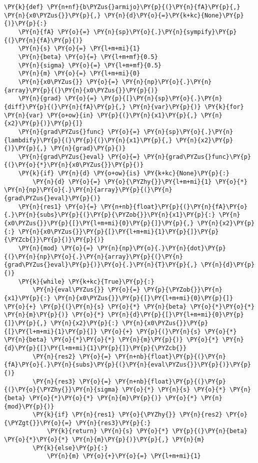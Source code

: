 \begin{itemize}
\begin{tcolorbox}[breakable, size=fbox, boxrule=1pt, pad at break*=1mm,colback=cellbackground, colframe=cellborder]
\begin{Verbatim}[commandchars=\\\{\}]
\PY{k}{def} \PY{n+nf}{b\PYZus{}armijo}\PY{p}{(}\PY{n}{fA}\PY{p}{,} \PY{n}{x0\PYZus{}}\PY{p}{,} \PY{n}{d}\PY{o}{=}\PY{k+kc}{None}\PY{p}{)}\PY{p}{:}
    \PY{n}{fA} \PY{o}{=} \PY{n}{sp}\PY{o}{.}\PY{n}{sympify}\PY{p}{(}\PY{n}{fA}\PY{p}{)}
    \PY{n}{s} \PY{o}{=} \PY{l+m+mi}{1}
    \PY{n}{beta} \PY{o}{=} \PY{l+m+mf}{0.5}
    \PY{n}{sigma} \PY{o}{=} \PY{l+m+mf}{0.5}
    \PY{n}{m} \PY{o}{=} \PY{l+m+mi}{0}
    \PY{n}{x0\PYZus{}} \PY{o}{=} \PY{n}{np}\PY{o}{.}\PY{n}{array}\PY{p}{(}\PY{n}{x0\PYZus{}}\PY{p}{)}
    \PY{n}{grad} \PY{o}{=} \PY{p}{[}\PY{n}{sp}\PY{o}{.}\PY{n}{diff}\PY{p}{(}\PY{n}{fA}\PY{p}{,} \PY{n}{var}\PY{p}{)} \PY{k}{for} \PY{n}{var} \PY{o+ow}{in} \PY{p}{(}\PY{n}{x1}\PY{p}{,} \PY{n}{x2}\PY{p}{)}\PY{p}{]}
    \PY{n}{grad\PYZus{}func} \PY{o}{=} \PY{n}{sp}\PY{o}{.}\PY{n}{lambdify}\PY{p}{(}\PY{p}{(}\PY{n}{x1}\PY{p}{,} \PY{n}{x2}\PY{p}{)}\PY{p}{,} \PY{n}{grad}\PY{p}{)}
    \PY{n}{grad\PYZus{}eval} \PY{o}{=} \PY{n}{grad\PYZus{}func}\PY{p}{(}\PY{o}{*}\PY{n}{x0\PYZus{}}\PY{p}{)}
    \PY{k}{if} \PY{n}{d} \PY{o+ow}{is} \PY{k+kc}{None}\PY{p}{:}
        \PY{n}{d} \PY{o}{=} \PY{o}{\PYZhy{}}\PY{l+m+mi}{1} \PY{o}{*} \PY{n}{np}\PY{o}{.}\PY{n}{array}\PY{p}{(}\PY{n}{grad\PYZus{}eval}\PY{p}{)}
    \PY{n}{res1} \PY{o}{=} \PY{n+nb}{float}\PY{p}{(}\PY{n}{fA}\PY{o}{.}\PY{n}{subs}\PY{p}{(}\PY{p}{\PYZob{}}\PY{n}{x1}\PY{p}{:} \PY{n}{x0\PYZus{}}\PY{p}{[}\PY{l+m+mi}{0}\PY{p}{]}\PY{p}{,} \PY{n}{x2}\PY{p}{:} \PY{n}{x0\PYZus{}}\PY{p}{[}\PY{l+m+mi}{1}\PY{p}{]}\PY{p}{\PYZcb{}}\PY{p}{)}\PY{p}{)}
    \PY{n}{mod} \PY{o}{=} \PY{n}{np}\PY{o}{.}\PY{n}{dot}\PY{p}{(}\PY{n}{np}\PY{o}{.}\PY{n}{array}\PY{p}{(}\PY{n}{grad\PYZus{}eval}\PY{p}{)}\PY{o}{.}\PY{n}{T}\PY{p}{,} \PY{n}{d}\PY{p}{)}
    \PY{k}{while} \PY{k+kc}{True}\PY{p}{:}
        \PY{n}{eval\PYZus{}} \PY{o}{=} \PY{p}{\PYZob{}}\PY{n}{x1}\PY{p}{:} \PY{n}{x0\PYZus{}}\PY{p}{[}\PY{l+m+mi}{0}\PY{p}{]} \PY{o}{+} \PY{p}{(}\PY{n}{s} \PY{o}{*} \PY{n}{beta} \PY{o}{*}\PY{o}{*} \PY{n}{m}\PY{p}{)} \PY{o}{*} \PY{n}{d}\PY{p}{[}\PY{l+m+mi}{0}\PY{p}{]}\PY{p}{,} \PY{n}{x2}\PY{p}{:} \PY{n}{x0\PYZus{}}\PY{p}{[}\PY{l+m+mi}{1}\PY{p}{]} \PY{o}{+} \PY{p}{(}\PY{n}{s} \PY{o}{*} \PY{n}{beta} \PY{o}{*}\PY{o}{*} \PY{n}{m}\PY{p}{)} \PY{o}{*} \PY{n}{d}\PY{p}{[}\PY{l+m+mi}{1}\PY{p}{]}\PY{p}{\PYZcb{}}
        \PY{n}{res2} \PY{o}{=} \PY{n+nb}{float}\PY{p}{(}\PY{n}{fA}\PY{o}{.}\PY{n}{subs}\PY{p}{(}\PY{n}{eval\PYZus{}}\PY{p}{)}\PY{p}{)}
        \PY{n}{res3} \PY{o}{=} \PY{n+nb}{float}\PY{p}{(}\PY{p}{(}\PY{o}{\PYZhy{}}\PY{n}{sigma} \PY{o}{*} \PY{n}{s} \PY{o}{*} \PY{n}{beta} \PY{o}{*}\PY{o}{*} \PY{n}{m}\PY{p}{)} \PY{o}{*} \PY{n}{mod}\PY{p}{)}
        \PY{k}{if} \PY{n}{res1} \PY{o}{\PYZhy{}} \PY{n}{res2} \PY{o}{\PYZgt{}}\PY{o}{=} \PY{n}{res3}\PY{p}{:}
            \PY{k}{return} \PY{n}{s} \PY{o}{*} \PY{p}{(}\PY{n}{beta} \PY{o}{*}\PY{o}{*} \PY{n}{m}\PY{p}{)}\PY{p}{,} \PY{n}{m}
        \PY{k}{else}\PY{p}{:}
            \PY{n}{m} \PY{o}{+}\PY{o}{=} \PY{l+m+mi}{1}
\end{Verbatim}
\end{tcolorbox}


\end{itemize}
